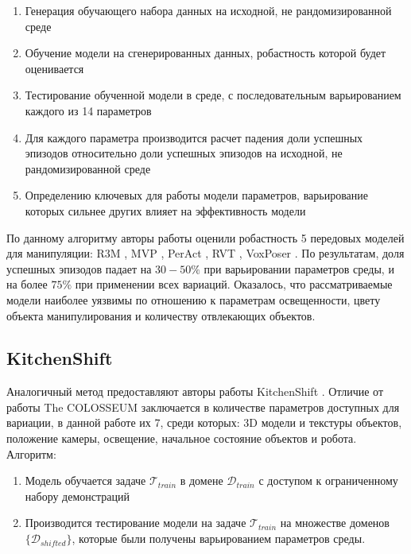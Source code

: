     \begin{enumerate}
        \item Генерация обучающего набора данных на исходной, не рандомизированной среде
        \item Обучение модели на сгенерированных данных, робастность которой будет оценивается
        \item Тестирование обученной модели в среде, с последовательным варьированием каждого из 14 параметров 
        \item Для каждого параметра производится расчет падения доли успешных эпизодов относительно доли успешных эпизодов на исходной, не рандомизированной среде
        \item Определению ключевых для работы модели параметров, варьирование которых сильнее других влияет на эффективность модели
    \end{enumerate}

    По данному алгоритму авторы работы оценили робастность 5 передовых моделей для манипуляции: R3M \cite{nair2022r3m}, MVP \cite{Radosavovic2022}, PerAct \cite{shridhar2022peract}, RVT \cite{goyal2023rvt}, VoxPoser \cite{huang2023voxposer}. По результатам, доля успешных эпизодов падает на $30-50\%$ при варьировании параметров среды, и на более $75\%$ при применении всех вариаций. Оказалось, что рассматриваемые модели наиболее уязвимы по отношению к параметрам освещенности, цвету объекта манипулирования и количеству отвлекающих объектов. 

    \subsection{KitchenShift}
        Аналогичный метод предоставляют авторы работы KitchenShift \cite{xing2021kitchenshift}. Отличие от работы The COLOSSEUM заключается в количестве параметров доступных для вариации, в данной работе их 7, среди которых: 3D модели и текстуры объектов, положение камеры, освещение, начальное состояние объектов и робота. Алгоритм:

        \begin{enumerate}
            \item Модель обучается задаче $\mathcal{T}_{train}$ в домене $\mathcal{D}_{train}$ с доступом к ограниченному набору демонстраций
            \item Производится тестирование модели на задаче $\mathcal{T}_{train}$ на множестве доменов $\{\mathcal{D}_{shifted}\}$, которые были получены варьированием параметров среды.
        \end{enumerate}

